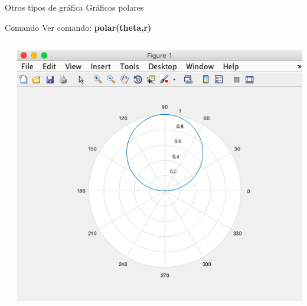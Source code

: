 \documentclass{bredelebeamer}
\begin{document}
\begin{frame}{Otros tipos de gráfica}
Gráficos polares
\begin{exampleblock}{Comando}
Ver comando: \textbf{polar(theta,r)}
\end{exampleblock}
\begin{columns}
\begin{column}{0.5\textwidth}
\begin{center}
\end{center}
\end{column}
\begin{column}{0.5\textwidth}
\begin{center}
\includegraphics[scale=0.2]{images/pantalla22.png}
\end{center}
\end{column}
\end{columns}
\end{frame}
\end{document}
